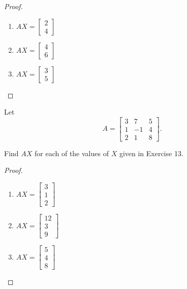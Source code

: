 \begin{proof}
    \begin{enumerate}[label={(\alph*)}]
        \item $AX = \begin{bmatrix}2 \\ 4\end{bmatrix}$
        \item $AX = \begin{bmatrix}4 \\ 6\end{bmatrix}$
        \item $AX = \begin{bmatrix}3 \\ 5\end{bmatrix}$
    \end{enumerate}
\end{proof}

\begin{exercise}
    Let
    \[
        A = \begin{bmatrix}
            3 & 7  & 5 \\
            1 & -1 & 4 \\
            2 & 1  & 8
        \end{bmatrix}.
    \]

    Find $AX$ for each of the values of $X$ given in Exercise 13.
\end{exercise}

\begin{proof}
    \begin{enumerate}[label={(\alph*)}]
        \item $AX = \begin{bmatrix}3 \\ 1 \\ 2\end{bmatrix}$
        \item $AX = \begin{bmatrix}12 \\ 3 \\ 9\end{bmatrix}$
        \item $AX = \begin{bmatrix}5 \\ 4 \\ 8\end{bmatrix}$
    \end{enumerate}
\end{proof}

